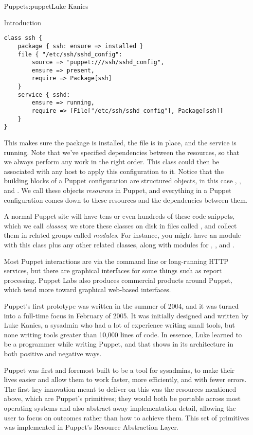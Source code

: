 \begin{aosachapter}{Puppet}{s:puppet}{Luke Kanies}
\begin{aosasect1}{Introduction}
\begin{verbatim}
class ssh {
    package { ssh: ensure => installed }
    file { "/etc/ssh/sshd_config":
        source => "puppet:///ssh/sshd_config",
        ensure => present,
        require => Package[ssh]
    }
    service { sshd:
        ensure => running,
        require => [File["/etc/ssh/sshd_config"], Package[ssh]]
    }
}
\end{verbatim}

\noindent This makes sure the package is installed, the file is in place, and
the service is running.  Note that we've specified dependencies
between the resources, so that we always perform any work in the right
order.  This class could then be associated with any host to apply
this configuration to it.  Notice that the building blocks of a Puppet
configuration are structured objects, in this case , ,
and .  We call these objects \emph{resources} in Puppet, and
everything in a Puppet configuration comes down to these resources and
the dependencies between them.

A normal Puppet site will have tens or even hundreds of these code
snippets, which we call \emph{classes}; we store these classes on disk in
files called , and collect them in related groups called
\emph{modules}. For instance, you might have an  module with this
 class plus any other related classes, along with modules for
, , and .

Most Puppet interactions are via the command line or long-running HTTP
services, but there are graphical interfaces for some things such as
report processing.  Puppet Labs also produces commercial products
around Puppet, which tend more toward graphical web-based interfaces.

Puppet's first prototype was written in the summer of 2004, and it was
turned into a full-time focus in February of 2005.  It was initially
designed and written by Luke Kanies, a sysadmin who had a lot of
experience writing small tools, but none writing tools greater than
10,000 lines of code.  In essence, Luke learned to be a programmer
while writing Puppet, and that shows in its architecture in both positive and negative
ways.

Puppet was first and foremost built to be a tool for sysadmins, to 
make their lives easier and allow them to work
faster, more efficiently, and with fewer errors.  The first key
innovation meant to deliver on this was the resources mentioned above,
which are Puppet's primitives;
they would both be portable across most operating
systems and also abstract away implementation detail, allowing the
user to focus on outcomes rather than how to achieve them.  This set
of primitives was implemented in Puppet's Resource Abstraction Layer.


\end{aosasect1}
\end{aosachapter}
